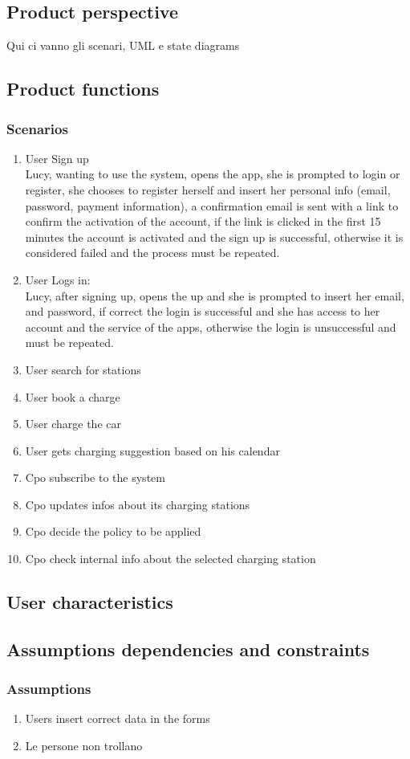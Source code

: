 \subsection{Product perspective}
Qui ci vanno gli scenari, UML e state diagrams
\subsection{Product functions}

\subsubsection{Scenarios}
\begin{enumerate}[label=S\arabic*]
    \item User Sign up\\
          Lucy, wanting to use the system, opens the app, she is prompted to login or register, she chooses to register herself and insert her personal info (email, password, payment information), a confirmation email is sent with a link to confirm the activation of the account, if the link is clicked in the first 15 minutes the account is activated and the sign up is successful, otherwise it is considered failed and the process must be repeated.
    \item User Logs in:\\
          Lucy, after signing up, opens the up and she is prompted to insert her email, and password, if correct the login is successful and she has access to her account and the service of the apps, otherwise the login is unsuccessful and must be repeated.
    \item User search for stations\\
    \item User book a charge\\
    \item User charge the car\\
    \item User gets charging suggestion based on his calendar\\
    \item Cpo subscribe to the system\\
    \item Cpo updates infos about its charging stations\\
    \item Cpo decide the policy to be applied\\
    \item Cpo check internal info about the selected charging station\\
\end{enumerate}
\subsection{User characteristics}

\subsection{Assumptions dependencies and constraints}
\subsubsection{Assumptions}
\begin{enumerate}[label=A\arabic*]
    \item Users insert correct data in the forms
    \item Le persone non trollano
\end{enumerate}
\clearpage